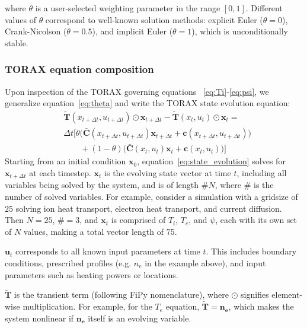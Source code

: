 \documentclass[aps, reprint, nofootinbib]{revtex4-2}
\begin{document}
where $\theta$ is a user-selected weighting parameter in the range $[0, 1]$.  Different values of $\theta$ correspond to well-known solution methods: explicit Euler ($\theta = 0$), Crank-Nicolson ($\theta = 0.5$), and implicit Euler ($\theta = 1$), which is unconditionally stable. 

\subsubsection{TORAX equation composition}
Upon inspection of the TORAX governing equations ~\ref{eq:Ti}-\ref{eq:psi}, we generalize equation~\ref{eq:theta} and write the TORAX state evolution equation:
\begin{equation}
\label{eq:state_evolution}
\begin{aligned}
& \mathbf{\tilde{T}}(x_{t + \Delta t}, u_{t + \Delta t})\odot\mathbf{x}_{t + \Delta t} - \mathbf{\tilde{T}}(x_t, u_t)\odot\mathbf{x}_t =  \\
& \Delta t \big[ \theta \big( \mathbf{\bar{C}}(x_{t+\Delta t}, u_{t+\Delta t})\mathbf{x}_{t+\Delta t} + \mathbf{c}(x_{t+\Delta t}, u_{t+\Delta t}) \big)  \\ 
& \qquad + (1-\theta) \big( \mathbf{\bar{C}}(x_t, u_t)\mathbf{x}_t + \mathbf{c}(x_{t}, u_{t}) \big) \big]
\end{aligned}
\end{equation}
Starting from an initial condition $\mathbf{x}_0$, equation~\ref{eq:state_evolution} solves for $\mathbf{x}_{t+\Delta t}$ at each timestep. $\mathbf{x}_t$ is the evolving state vector at time $t$, including all variables being solved by the system, and is of length $\#N$, where $\#$ is the number of solved variables. For example, consider a simulation with a gridsize of $25$ solving ion heat transport, electron heat transport, and current diffusion. Then $N=25$, $\#=3$, and $\mathbf{x}_t$ is comprised of $T_i$, $T_e$, and $\psi$, each with its own set of $N$ values, making a total vector length of 75.

$\mathbf{u}_t$ corresponds to all known input parameters at time $t$. This includes boundary conditions, prescribed profiles (e.g. $n_e$ in the example above), and input parameters such as heating powers or locations. 

$\mathbf{\tilde{T}}$ is the transient term (following FiPy nomenclature), where $\odot$ signifies element-wise multiplication. For example, for the $T_e$ equation, $\mathbf{\tilde{T}}=\mathbf{n_e}$, which makes the system nonlinear if $\mathbf{n_e}$ itself is an evolving variable.
\end{document}
